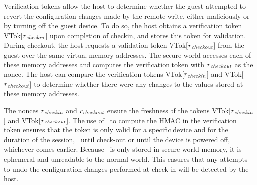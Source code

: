 Verification tokens allow the host to determine whether the guest attempted to
revert the configuration changes made by the remote write, either maliciously
or by turning off the guest device. To do so, the host obtains a verification
token \textsf{VTok}[$r_{{\it checkin}}$] upon completion of checkin, and
stores this token for validation. During checkout, the host requests a
validation token \textsf{VTok}[$r_{\it checkout}$] from the guest over the
same virtual memory addresses. The secure world accesses each of these memory
addresses and computes the verification token with $r_{\it checkout}$ as the
nonce. The host can compare the verification tokens
\textsf{VTok}[$r_{{\it checkin}}$] and
\textsf{VTok}[$r_{{\it checkout}}$] to determine whether there were any
changes to the values stored at these memory addresses. 

The nonces $r_{\it checkin}$ and $r_{\it checkout}$ ensure the freshness of the
tokens \textsf{VTok}[$r_{{\it checkin}}$] and \textsf{VTok}[$r_{{\it
checkout}}$].  The use of \ks\ to compute the HMAC in the verification token
ensures that the token is only valid for a specific device and for the duration
of the session, \ie~until check-out or until the device is powered off,
whichever comes earlier. Because \ks\ is only stored in secure world memory, it
is ephemeral and unreadable to the normal world. This ensures that any attempts
to undo the configuration changes performed at check-in will be detected by the
host.


